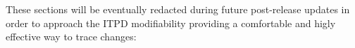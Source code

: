 These sections will be eventually redacted during future post-release updates in order to approach the ITPD modifiability providing a comfortable and higly effective way to trace changes:
